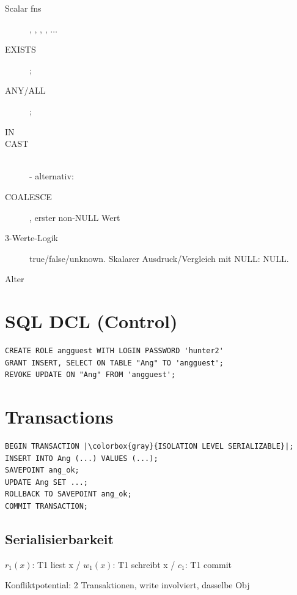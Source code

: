 \begin{multicols*}{3}
\begin{description}
\item[Scalar fns]{, , , , $\ldots$}
\item[EXISTS]{;}
\item[ANY/ALL]{;}
\item[IN]{}
\item[CAST]{ \\  - alternativ: }
\item[COALESCE]{, erster non-NULL Wert}
\item[3-Werte-Logik]{true/false/unknown. Skalarer Ausdruck/Vergleich mit NULL: NULL.}
\item[Alter]{}
\end{description}

\section{SQL DCL (Control)}
\begin{verbatim}
CREATE ROLE angguest WITH LOGIN PASSWORD 'hunter2'
GRANT INSERT, SELECT ON TABLE "Ang" TO 'angguest';
REVOKE UPDATE ON "Ang" FROM 'angguest';
\end{verbatim}

\section{Transactions}
\begin{verbatim}
BEGIN TRANSACTION |\colorbox{gray}{ISOLATION LEVEL SERIALIZABLE}|;
INSERT INTO Ang (...) VALUES (...);
SAVEPOINT ang_ok;
UPDATE Ang SET ...;
ROLLBACK TO SAVEPOINT ang_ok;
COMMIT TRANSACTION;
\end{verbatim}


\subsection{Serialisierbarkeit}
$r_{1}(x)$: T1 liest x / $w_{1}(x)$: T1 schreibt x / $c_{1}$: T1 commit

Konfliktpotential: 2 Transaktionen, write involviert, dasselbe Obj


\end{multicols*}
